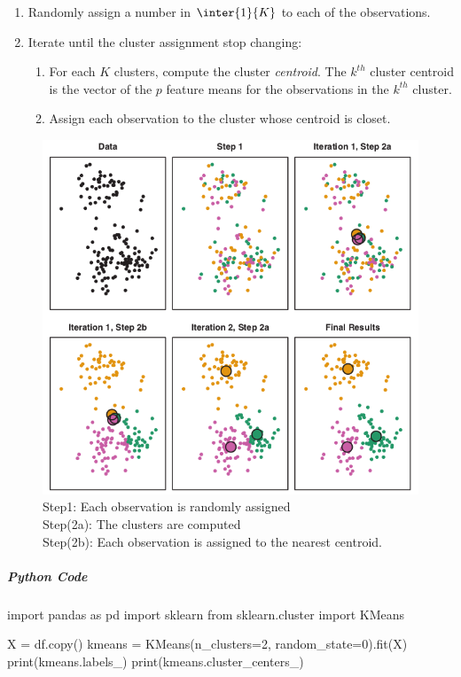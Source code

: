 \begin{enumerate}
	\item Randomly assign a number in $\inter{1}{K}$ to each of the
		observations.
	\item Iterate until the cluster assignment stop changing:
		\begin{enumerate}[label=(\alph*)]
			\item For each $K$ clusters, compute the
				cluster \emph{centroid}. The $k^{th}$
				cluster centroid is the vector of 
				the $p$ feature means for the 
				observations in the $k^{th}$ cluster.
			\item Assign each observation to the cluster
				whose centroid is closet.
			\end{enumerate}
\end{enumerate}
\begin{figure}[H]
	\begin{center}
		\includegraphics[width=.5\textwidth]{./chap/1chap/9sec/images/1kMeans.png}
	\end{center}
	\caption{Step1: Each observation is randomly assigned\\
	Step(2a): The clusters are computed\\
	Step(2b): Each observation is assigned to the nearest centroid.}
	\label{fig:9.1kMeans}
\end{figure}
\subparagraph{Python Code}
\begin{python}
import pandas as pd
import sklearn
from sklearn.cluster import KMeans

X = df.copy()
kmeans = KMeans(n_clusters=2,
    random_state=0).fit(X)
print(kmeans.labels_)
print(kmeans.cluster_centers_)
\end{python}

